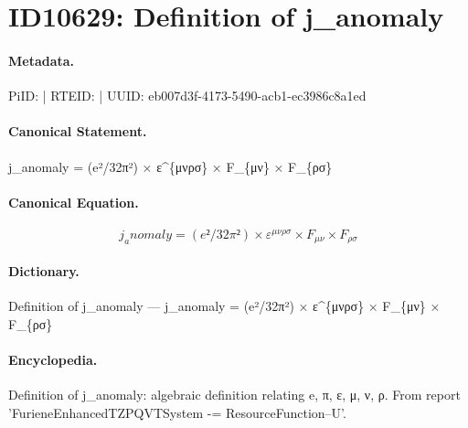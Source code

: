 \section*{ID10629: Definition of j\_anomaly}
\paragraph{Metadata.}
PiID:  | RTEID:  | UUID: eb007d3f-4173-5490-acb1-ec3986c8a1ed

\paragraph{Canonical Statement.}
j\_anomaly = (e²/32π²) × ε\textasciicircum{}\{μνρσ\} × F\_\{μν\} × F\_\{ρσ\}

\paragraph{Canonical Equation.}
\[
j_anomaly = (e²/32π²) × ε^{μνρσ} × F_{μν} × F_{ρσ}
\]

\paragraph{Dictionary.}
Definition of j\_anomaly — j\_anomaly = (e²/32π²) × ε\textasciicircum{}\{μνρσ\} × F\_\{μν\} × F\_\{ρσ\}

\paragraph{Encyclopedia.}
Definition of j\_anomaly: algebraic definition relating e, π, ε, μ, ν, ρ. From report 'FurieneEnhancedTZPQVTSystem -= ResourceFunction--U'.
